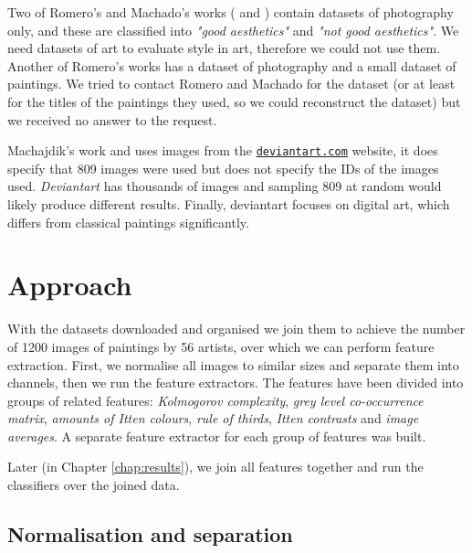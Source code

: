 \documentclass[11pt,a4paper,twoside,openright]{report}
\begin{document}
Two of Romero's and Machado's works (\cite{jma12clas} and \cite{cmrc13fs})
contain datasets of photography only, and these are classified into \emph{"good
aesthetics"} and \emph{"not good aesthetics"}.  We need datasets of art to
evaluate style in art, therefore we could not use them.  Another of Romero's
works \cite{rmc12ajs} has a dataset of photography and a small dataset of
paintings.  We tried to contact Romero and Machado for the dataset (or at least
for the titles of the paintings they used, so we could reconstruct the dataset)
but we received no answer to the request.

Machajdik's work \cite{mach10clas} and \cite{mach10ua} uses images from the
\href{http://deviantart.com}{\texttt{deviantart.com}} website, it does specify
that 809 images were used but does not specify the IDs of the images used.
\emph{Deviantart} has thousands of images and sampling 809 at random would
likely produce different results.  Finally, deviantart focuses on digital art,
which differs from classical paintings significantly.


\clearpage{\pagestyle{empty}\cleardoublepage}
\chapter{Approach}  %
\label{chap:approach}

With the datasets downloaded and organised we join them to achieve the number
of 1200 images of paintings by 56 artists, over which we can perform feature
extraction.  First, we normalise all images to similar sizes and separate them
into channels, then we run the feature extractors.  The features have been
divided into groups of related features: \emph{Kolmogorov complexity},
\emph{grey level co-occurrence matrix}, \emph{amounts of Itten colours},
\emph{rule of thirds}, \emph{Itten contrasts} and \emph{image averages}.  A
separate feature extractor for each group of features was built.

Later (in Chapter \ref{chap:results}), we join all features together and run
the classifiers over the joined data.

\section{Normalisation and separation}
\end{document}
